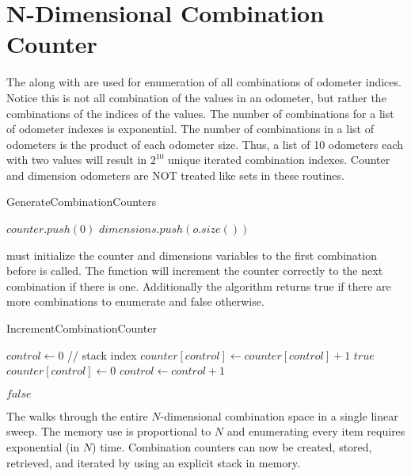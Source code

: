 \section{N-Dimensional Combination Counter}

The  along with  are used for enumeration of all combinations of odometer indices. Notice this is not all combination of the values in an odometer, but rather the combinations of the indices of the values. The number of combinations for a list of odometer indexes is exponential. The number of combinations in a list of odometers is the product of each odometer size. Thus, a list of 10 odometers each with two values will result in $2^{10}$ unique iterated combination indexes. Counter and dimension odometers are NOT treated like sets in these routines. 

\begin{algorithm}[H]
    \centering
	\caption{GenerateCombinationCounters}\label{GenerateCombinationCounters}
	\begin{algorithmic}[1]
		 
		\State $counter.push(0)$ 
		\State $dimensions.push(o.size())$ 
		\EndFor
		\EndFunction
	\end{algorithmic}
\end{algorithm}

 must initialize the counter and dimensions variables to the first combination before   is called.  The function will increment the counter correctly to the next combination if there is one. Additionally the algorithm returns true if there are more combinations to enumerate and false otherwise.

\begin{algorithm}[H]
    \centering
	\caption{IncrementCombinationCounter}\label{IncrementCombinationCounter}
	\begin{algorithmic}[1]
		\State $control \gets 0$ // stack index
		\State $counter[control] \gets counter[control] +1$
		\State \Return $true$
		\Else
		\State $counter[control] \gets 0$
		\State $control \gets control + 1$
		\EndIf
		
		\EndWhile
		\State \Return $false$ 
		\EndFunction
	\end{algorithmic}
\end{algorithm}

The  walks through the entire  $N$-dimensional combination space in a single linear sweep. The memory use is proportional to $N$ and enumerating every item requires exponential (in $N$) time. Combination counters can now be created, stored, retrieved, and iterated by using an explicit stack in memory.
